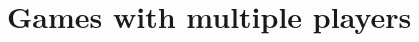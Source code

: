 \documentclass[a4paper,10pt]{article}
\begin{document}
% 
% 
% 
% 
% 
% 
% 

\section{Games with multiple players}
\end{document}
